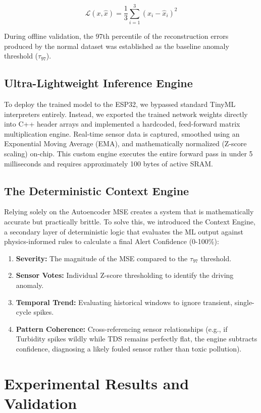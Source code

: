 \documentclass[runningheads]{llncs}
\begin{document}
\begin{equation}
\mathcal{L}(x, \hat{x}) = \frac{1}{3} \sum_{i=1}^{3} (x_i - \hat{x}_i)^2 \label{eq:mse}
\end{equation}

During offline validation, the 97th percentile of the reconstruction errors produced by the normal dataset was established as the baseline anomaly threshold ($\tau_{97}$).

\subsection{Ultra-Lightweight Inference Engine}
To deploy the trained model to the ESP32, we bypassed standard TinyML interpreters entirely. Instead, we exported the trained network weights directly into C++ header arrays and implemented a hardcoded, feed-forward matrix multiplication engine. Real-time sensor data is captured, smoothed using an Exponential Moving Average (EMA), and mathematically normalized (Z-score scaling) on-chip. This custom engine executes the entire forward pass in under 5 milliseconds and requires approximately 100 bytes of active SRAM.

\subsection{The Deterministic Context Engine}
Relying solely on the Autoencoder MSE creates a system that is mathematically accurate but practically brittle. To solve this, we introduced the Context Engine, a secondary layer of deterministic logic that evaluates the ML output against physics-informed rules to calculate a final Alert Confidence (0-100\%):
\begin{enumerate}
    \item \textbf{Severity:} The magnitude of the MSE compared to the $\tau_{97}$ threshold.
    \item \textbf{Sensor Votes:} Individual Z-score thresholding to identify the driving anomaly.
    \item \textbf{Temporal Trend:} Evaluating historical windows to ignore transient, single-cycle spikes.
    \item \textbf{Pattern Coherence:} Cross-referencing sensor relationships (e.g., if Turbidity spikes wildly while TDS remains perfectly flat, the engine subtracts confidence, diagnosing a likely fouled sensor rather than toxic pollution).
\end{enumerate}

\section{Experimental Results and Validation}
\label{sec:results}
\end{document}
